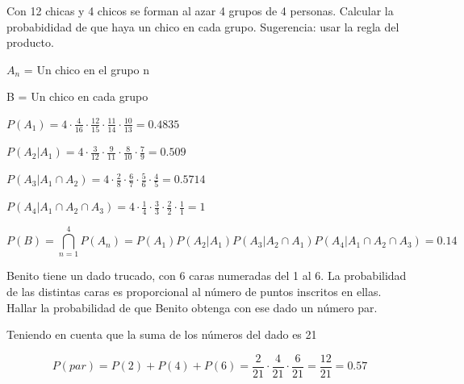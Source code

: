 \begin{problem}[6]Con 12 chicas y 4 chicos se forman al azar 4 grupos de 4 personas.
Calcular la probabididad de que haya un chico en cada grupo. Sugerencia:
usar la regla del producto.
 
\solution

\begin{expla}

$A_n$ = Un chico en el grupo n

B = Un chico en cada grupo
\end{expla}

$P(A_1)=4\cdot\frac{4}{16}\cdot\frac{12}{15}\cdot\frac{11}{14}\cdot\frac{10}{13}=0.4835$

$P(A_2|A_1)=4\cdot\frac{3}{12}\cdot\frac{9}{11}\cdot\frac{8}{10}\cdot\frac{7}{9}=0.509$

$P(A_3|A_1\cap A_2)=4\cdot\frac{2}{8}\cdot\frac{6}{7}\cdot\frac{5}{6}\cdot\frac{4}{5}=0.5714$

$P(A_4|A_1\cap A_2\cap A_3)=4\cdot\frac{1}{4}\cdot\frac{3}{3}\cdot\frac{2}{2}\cdot\frac{1}{1}=1$


\[
P(B)=\bigcap_{n=1}^4P(A_n)=P(A_1)P(A_2|A_1)P(A_3|A_2\cap A_1)P(A_4|A_1\cap A_2\cap A_3)=0.14
\]




\end{problem}


\begin{problem}[7]Benito tiene un dado  trucado, con 6 caras  numeradas del 1 al 6. 
La probabilidad de las
distintas caras es proporcional al n\'umero de puntos inscritos en
ellas. Hallar la probabilidad de que Benito obtenga con ese dado un n\'umero
par.
\solution

\begin{expla}

Teniendo en cuenta que la suma de los números del dado es 21

\end{expla}

\[
P(par)=P(2)+P(4)+P(6)=\frac{2}{21}\cdot\frac{4}{21}\cdot\frac{6}{21}=\frac{12}{21}=0.57
\]

\end{problem}


